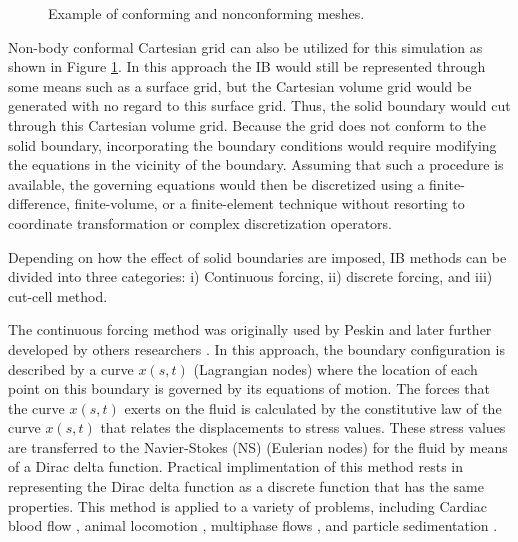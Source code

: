 \begin{figure}[H]
{	}
	\quad
	\caption{Example of conforming and nonconforming meshes.}
	\label{fig:C1_conformalVSnonconformal}
\end{figure}
%

Non-body conformal Cartesian grid can also be utilized for this simulation as shown in Figure \ref{fig:C1_conformalVSnonconformal}. In this approach the IB would still be represented through some means such as a surface grid, but the Cartesian volume grid would be generated with no regard to this surface grid. Thus, the solid boundary would cut through this Cartesian volume grid. Because the grid does not conform to the solid boundary, incorporating the boundary conditions would require modifying the equations in the vicinity of the boundary. Assuming that such a procedure is available, the governing equations would then be discretized using a finite-difference, finite-volume, or a finite-element technique without resorting to coordinate transformation or complex discretization operators.

Depending on how the effect of solid boundaries are imposed, IB methods can be divided into three categories: i) Continuous forcing, ii) discrete forcing, and iii) cut-cell method.

The continuous forcing method was originally used by Peskin \cite{peskin1977numerical} and later further developed by others researchers \cite{saiki1996numerical, zhu2003interaction, beyer1992analysis}. In this approach, the boundary configuration is described by a curve $x(s,t)$ (Lagrangian nodes) where the location of each point on this boundary is governed by its equations of motion. The forces that the curve $x(s,t)$ exerts on the fluid is calculated by the constitutive law of the curve $x(s,t)$ that relates the displacements to stress values. These stress values are transferred to the Navier-Stokes (NS) (Eulerian nodes) for the fluid by means of a Dirac delta function. Practical implimentation of this method rests in representing the Dirac delta function as a discrete function that has the same properties. This method is applied to a variety of problems, including Cardiac blood flow \cite{peskin1989three}, animal locomotion \cite{fauci1988computational}, multiphase flows \cite{kempe2015imposing}, and particle sedimentation \cite{uhlmann2005immersed}.

